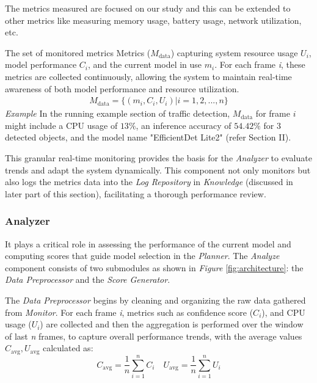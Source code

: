 The metrics measured are focused on our study and this can be extended to other metrics like measuring memory usage, battery usage, network utilization, etc.

The set of monitored metrics Metrics (\(M_\text{data}\)) capturing system resource usage \(U_i\), model performance \(C_i\), and the current model in use \(m_i\). For each frame \textit{i}, these metrics are collected continuously, allowing the system to maintain real-time awareness of both model performance and resource utilization. 
\begin{align*}
M_{\text{data}} = \{(m_i, C_i, U_i) | i = 1,2,...,n\}
\end{align*}
\textit{Example} In the running example section of traffic detection, \(M_\text{data}\) for frame \(i\) might include a CPU usage of \(13\%\), an inference accuracy of \(54.42\%\) for \(3\) detected objects, and the model name "EfficientDet Lite2" (refer Section II).

This granular real-time monitoring provides the basis for the \textit{Analyzer} to evaluate trends and adapt the system dynamically. This component not only monitors but also logs the metrics data into the \textit{Log Repository} in \textit{Knowledge} (discussed in later part of this section), facilitating a thorough performance review. 



\subsubsection{\textbf{Analyzer}}

It plays a critical role in assessing the performance of the current model and computing scores that guide model selection in the \textit{Planner}. The \textit{Analyze} component consists of two submodules as shown in \textit{Figure} \ref{fig:architecture}: the \textit{Data Preprocessor} and the \textit{Score Generator}.

The \textit{Data Preprocessor} begins by cleaning and organizing the raw data gathered from \textit{Monitor}. For each frame \textit{i}, metrics such as confidence score (\(C_i\)), and CPU usage (\(U_i\)) are collected and then the aggregation is performed over the window of last \textit{n} frames, to capture overall performance trends, with the average values \(C_\text{avg}, U_\text{avg}\) calculated as:
\[C_\text{avg} = \frac{1}{n} \sum_{i=1}^{n} C_i \quad 
U_\text{avg} = \frac{1}{n} \sum_{i=1}^{n} U_i\]

